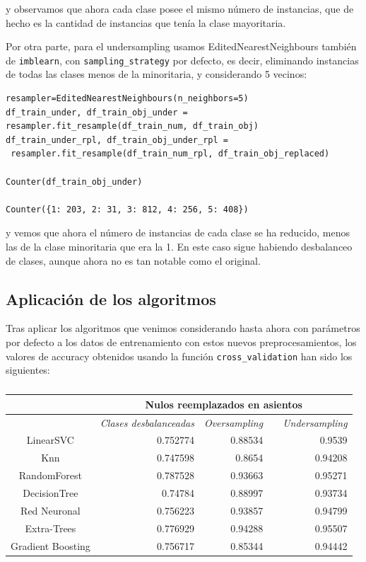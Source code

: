 \documentclass[a4paper,11pt]{article}
\begin{document}
y observamos que ahora cada clase posee el mismo número de instancias, que de hecho es la cantidad de instancias que tenía la clase mayoritaria. 

Por otra parte, para el undersampling usamos EditedNearestNeighbours también de \texttt{imblearn}, con \texttt{sampling_strategy} por defecto, es decir, eliminando instancias de todas las clases menos de la minoritaria, y considerando 5 vecinos:
\begin{verbatim}
resampler=EditedNearestNeighbours(n_neighbors=5)
df_train_under, df_train_obj_under = resampler.fit_resample(df_train_num, df_train_obj)
df_train_under_rpl, df_train_obj_under_rpl =
 resampler.fit_resample(df_train_num_rpl, df_train_obj_replaced)

Counter(df_train_obj_under)

Counter({1: 203, 2: 31, 3: 812, 4: 256, 5: 408})
\end{verbatim}

y vemos que ahora el número de instancias de cada clase se ha reducido, menos las de la clase minoritaria que era la 1. En este caso sigue habiendo desbalanceo de clases, aunque ahora no es tan notable como el original. 

\subsection{Aplicación de los algoritmos}

Tras aplicar los algoritmos que venimos considerando hasta ahora con parámetros por defecto a los datos de entrenamiento con estos nuevos preprocesamientos, los valores de accuracy obtenidos usando la función \texttt{cross_validation} han sido los siguientes:

\begin{table}[htbp]
	\caption{}\begin{center}
	\begin{tabular}{|c|r|r|l|r|}
		\hline
		\multicolumn{1}{|l|}{} & \multicolumn{ 4}{c|}{\textbf{Nulos reemplazados en asientos}} \\ \hline
		\multicolumn{1}{|l|}{} & \multicolumn{1}{l|}{\textit{Clases desbalanceadas}} & \multicolumn{1}{l|}{\textit{Oversampling}} & \textit{} & \multicolumn{1}{l|}{\textit{Undersampling}} \\ \hline
		LinearSVC & 0.752774 & 0.88534 &  & 0.9539 \\ \hline
		Knn & 0.747598 & 0.8654 &  & 0.94208 \\ \hline
		RandomForest & 0.787528 & 0.93663 &  & 0.95271 \\ \hline
		DecisionTree & 0.74784 & 0.88997 &  & 0.93734 \\ \hline
		Red Neuronal & 0.756223 & 0.93857 &  & 0.94799 \\ \hline
		Extra-Trees & 0.776929 & 0.94288 &  & 0.95507 \\ \hline
		Gradient Boosting & 0.756717 & 0.85344 &  & 0.94442 \\ \hline
	\end{tabular}\end{center}
	\label{}
\end{table}
\end{document}
